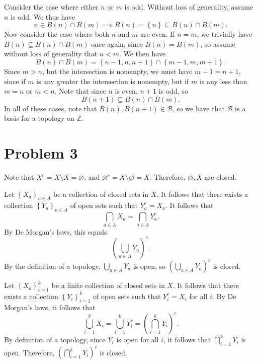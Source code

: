 \documentclass[11pt, letterpaper]{article}
\begin{document}
Consider the case where either $n$ or $m$ is odd. Without loss of generality, assume $n$ is odd. We thus have
\[
	n\in B(n)\cap B(m) \implies B(n) = \left\{ n \right\} \subseteq B(n)\cap B(m)
.\]
Now consider the case where both $n$ and $m$ are even. If $n=m$, we trivially have $B(n)\subseteq B(n)\cap B(m)$ once again, since $B(n)=B(m)$, so assume without loss of generality that $n<m$. We then have
\[
	B(n)\cap B(m)=\left\{ n-1,n,n+1 \right\} \cap \left\{ m-1,m,m+1 \right\} 
.\]
Since $m>n$, but the intersection is nonempty, we must have $m-1=n+1$, since if $m$ is any greater the intersection is nonempty, but if $m$ is any less than $m=n$ or $m<n$. Note that since $n$ is even, $n+1$ is odd, so
\[
	B(n+1) \subseteq B(n)\cap B(m)
.\]
In all of these cases, note that $B(n),B(n+1)\in \mathcal{B} $, so we have that $\mathcal{B} $ is a basis for a topology on $\mathbb{Z} $.
\section*{Problem 3}
Note that $X^{c} =X\setminus X=\varnothing $, and $\varnothing ^{c} =X\setminus \varnothing =X$. Therefore, $\varnothing ,X$ are closed.

Let $\left\{ X_a \right\}_{a\in A} $ be a collection of closed sets in $X$. It follows that there exists a collection $\left\{ Y_a \right\}_{a\in A} $ of open sets such that $ Y_a ^{c} =X_a$. It follows that
\[
	\bigcap_{a\in A} X_a = \bigcap_{a\in A} Y_a^{c} 
.\]
By De Morgan's laws, this equals
\[
	\left( \bigcup_{a\in A} Y_a \right ) ^{c} 
.\]
By the definition of a topology, $\bigcup_{a\in A} Y_a$ is open, so $\left( \bigcup_{a\in A} Y_a \right ) ^{c} $ is closed.

Let $\left\{ X_k \right\}_{i=1}^k$ be a finite collection of closed sets in $X$. It follows that there exists a collection $\left\{ Y_i \right\}_{i=1}^k$ of open sets such that $Y_i^{c} =X_i$ for all $i$. By De Morgan's laws, it follows that
\[
	\bigcup_{i=1} ^k X_i = \bigcup_{i=1} ^k Y_i^{c} =\left( \bigcap_{i=1} ^k Y_i \right ) ^{c} 
.\]
By definition of a topology, since $Y_i$ is open for all $i$, it follows that $\bigcap_{i=1} ^k Y_i$ is open. Therefore, $\left( \bigcap_{i=1} ^k Y_i \right ) ^{c} $ is closed.
\end{document}

